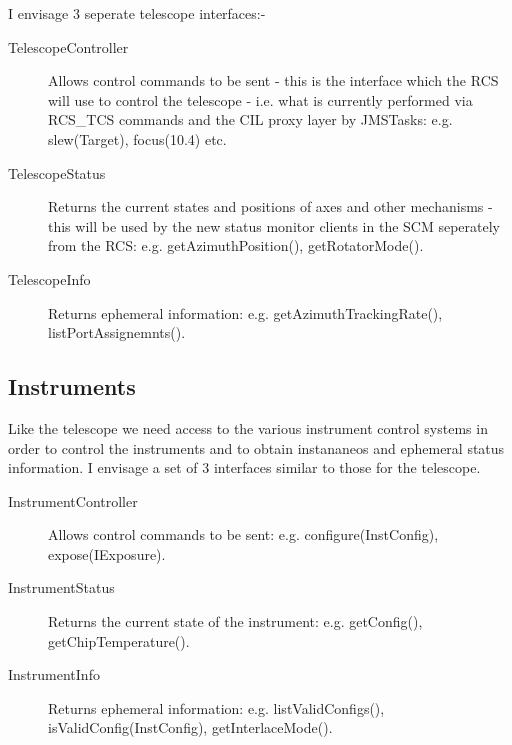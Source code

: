 I envisage 3 seperate telescope interfaces:-

\begin{description}
\item [TelescopeController] Allows control commands to be sent - this is the interface which the RCS will use to control the telescope - i.e. what is currently performed via RCS\_TCS commands and the CIL proxy layer by JMSTasks: 
e.g. \textsf{slew(Target)}, \textsf{focus(10.4)} etc.
\item [TelescopeStatus] Returns the current states and positions of axes and other mechanisms - this will be used by the new status monitor clients in the SCM seperately from the RCS:
e.g. \textsf{getAzimuthPosition()}, \textsf{getRotatorMode()}.
\item [TelescopeInfo] Returns ephemeral information: e.g. \textsf{getAzimuthTrackingRate()}, \textsf{listPortAssignemnts(}).
\end{description}

\subsection{Instruments}
Like the telescope we need access to the various instrument control systems in order to control the instruments and to obtain instananeos and ephemeral status information. I envisage a set of 3 interfaces similar to those for the telescope.
\begin{description}
\item [InstrumentController] Allows control commands to be sent: e.g. \textsf{configure(InstConfig)}, \textsf{expose(IExposure)}.
\item [InstrumentStatus] Returns the current state of the instrument: e.g. \textsf{getConfig()}, \textsf{getChipTemperature()}.
\item [InstrumentInfo] Returns ephemeral information: e.g. \textsf{listValidConfigs()}, \textsf{isValidConfig(InstConfig)}, \textsf{getInterlaceMode()}.
\end{description}
